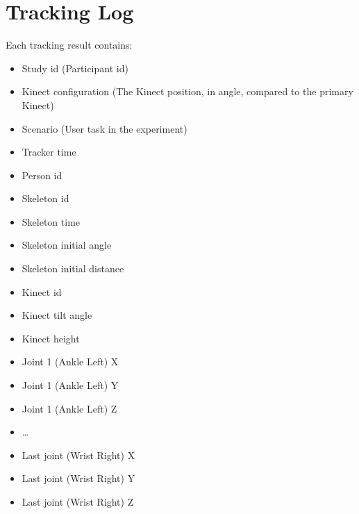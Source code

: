 \section{Tracking Log}
\label{sec:appendix_logging}

Each tracking result contains:

\begin{itemize}
  \item Study id (Participant id)
  \item Kinect configuration (The Kinect position, in angle, compared to the primary Kinect)
  \item Scenario (User task in the experiment)
  \item Tracker time
  \item Person id
  \item Skeleton id
  \item Skeleton time
  \item Skeleton initial angle
  \item Skeleton initial distance
  \item Kinect id
  \item Kinect tilt angle
  \item Kinect height
  \item Joint 1 (Ankle Left) X
  \item Joint 1 (Ankle Left) Y
  \item Joint 1 (Ankle Left) Z
  \item \ldots
  \item Last joint (Wrist Right) X
  \item Last joint (Wrist Right) Y 
  \item Last joint (Wrist Right) Z
\end{itemize}


